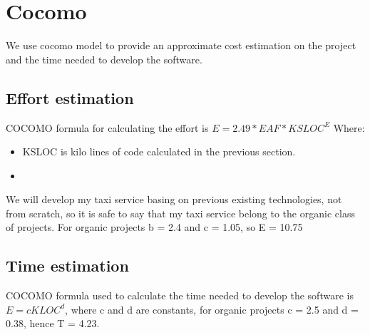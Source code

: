 \section{Cocomo}
We use cocomo model to provide an approximate cost estimation on the project and the time needed to develop the software.

\subsection{Effort estimation}
COCOMO formula for calculating the effort is $E= 2.49*EAF*KSLOC^{E}$
Where:
\begin{itemize}
	\item KSLOC is kilo lines of code calculated in the previous section.
	\item 
\end{itemize}

We will develop my taxi service basing on previous existing technologies, not from scratch, so it is safe to say that my taxi service belong to the organic class of projects.
For organic projects b = 2.4 and c = 1.05, so E = 10.75

\subsection{Time estimation}
COCOMO formula used to calculate the time needed to develop the software is $E = cKLOC^{d}$, where c and d are constants, for organic projects c = 2.5 and d = 0.38, hence T = 4.23.

